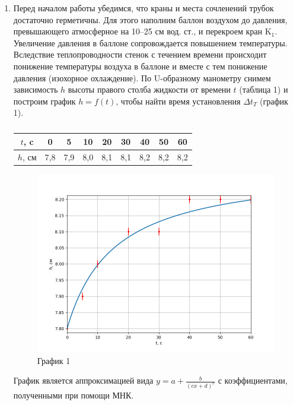 \documentclass[a4paper,12pt]{article} %
\begin{document}
\begin{enumerate}
	\item Перед началом работы убедимся, что краны и места сочленений трубок достаточно герметичны. Для этого наполним баллон воздухом до давления, превышающего атмосферное на 10–25 см вод. ст., и перекроем кран $\text{K}_{1}$. Увеличение давления в баллоне сопровождается повышением температуры. Вследствие теплопроводности стенок с течением времени происходит понижение температуры воздуха в баллоне и вместе с тем понижение давления (изохорное охлаждение). По U-образному манометру снимем зависимость $h$ высоты правого столба жидкости от времени $t$ (таблица 1) и построим график $h = f(t)$, чтобы найти время установления $\Delta t_{T}$ (график 1).
	
	
	\begin{table}[h!]
		\centering
		\begin{tabular}{|c|c|c|c|c|c|c|c|c|}
			\hline
			$t$, c  & 0   & 5   & 10  & 20  & 30  & 40  & 50  & 60  \\ \hline
			$h$, см & 7,8 & 7,9 & 8,0 & 8,1 & 8,1 & 8,2 & 8,2 & 8,2 \\ \hline
		\end{tabular}
	\caption{}
	\end{table}

	\begin{figure}[h!]
		\centering
		\includegraphics[scale = 0.8]{h(t).png}
		\caption*{График 1}
	\end{figure}
\newpage
График является аппроксимацией вида $y = a + \frac{b}{(cx+d)^{e}}$ с коэффициентами, полученными при помощи МНК.



\end{enumerate}
\end{document}
